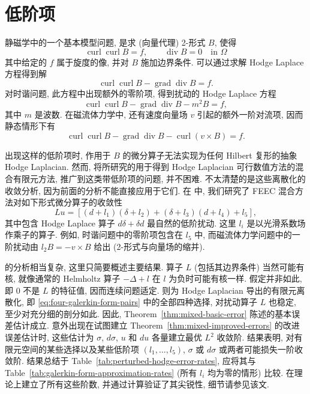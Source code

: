 \section{{低阶项}}\label{sec:lower-order-terms}

{静磁学中的一个基本模型问题, 是求 (向量代理) 2-形式 $B$, 使得}
\[
\operatorname{curl}\operatorname{curl}B=f,\qquad\operatorname{div}B=0\quad\text{in }\Omega
\]
{其中给定的 $f$ 属于旋度的像, 并对 $B$ 施加边界条件. 可以通过求解 Hodge Laplace 方程得到解}
\[
\operatorname{curl}\operatorname{curl}B-\operatorname{grad}\operatorname{div}B=f.
\]
{对时谐问题, 此方程中出现额外的零阶项, 得到扰动的 Hodge Laplace 方程}
\[
\operatorname{curl}\operatorname{curl}B-\operatorname{grad}\operatorname{div}B-m^2B=f,
\]
{其中 $m$ 是波数. 在磁流体力学中, 还有速度向量场 $v$ 引起的额外一阶对流项, 因而静态情形下有}
\[
\operatorname{curl}\operatorname{curl}B-\operatorname{grad}\operatorname{div}B-\operatorname{curl}(v\times B)=f.
\]

{出现这样的低阶项时, 作用于 $B$ 的微分算子无法实现为任何 Hilbert 复形的抽象 Hodge Laplacian. 然而, 将所研究的用于得到 Hodge Laplacian 可行数值方法的混合有限元方法, 推广到这类带低阶项的问题, 并不困难. 不太清楚的是这些离散化的收敛分析, 因为前面的分析不能直接应用于它们. 在  中, 我们研究了 FEEC 混合方法对如下形式微分算子的收敛性}
\[
Lu=[(d+l_1)(\delta+l_2)+(\delta+l_3)(d+l_4)+l_5],
\]
{其中包含 Hodge Laplace 算子 $d\delta+\delta d$ 最自然的低阶扰动. 这里 $l_i$ 是以光滑系数场作乘子的算子. 例如, 时谐问题中的零阶项包含在 $l_5$ 中, 而磁流体力学问题中的一阶扰动由 $l_2B=-v\times B$ 给出 (2-形式与向量场的缩并).}

{ 的分析相当复杂, 这里只简要概述主要结果. 算子 $L$ (包括其边界条件) 当然可能有核, 就像通常的 Helmholtz 算子 $-\Delta+l$ 在 $l$ 为负时可能有核一样. 假定并非如此, 即 $0$ 不是 $L$ 的特征值, 因而连续问题适定. 则为 Hodge Laplacian 导出的有限元离散化, 即 \eqref{eq:four-galerkin-form-pairs} 中的全部四种选择, 对扰动算子 $L$ 也稳定, 至少对充分细的剖分如此. 因此, Theorem~\ref{thm:mixed-basic-error} 陈述的基本误差估计成立. 意外出现在试图建立 Theorem~\ref{thm:mixed-improved-errors} 的改进误差估计时, 这些估计为 $\sigma$, $d\sigma$, $u$ 和 $du$ 各量建立最优 $L^2$ 收敛阶. 结果表明, 对有限元空间的某些选择以及某些低阶项 $(l_1,\ldots,l_5)$, $\sigma$ 或 $d\sigma$ 或两者可能损失一阶收敛阶. 结果总结于 Table~\ref{tab:perturbed-hodge-error-rates}, 应将其与 Table~\ref{tab:galerkin-form-approximation-rates} (所有 $l_i$ 均为零的情形) 比较.  在理论上建立了所有这些阶数, 并通过计算验证了其尖锐性, 细节请参见该文.}

